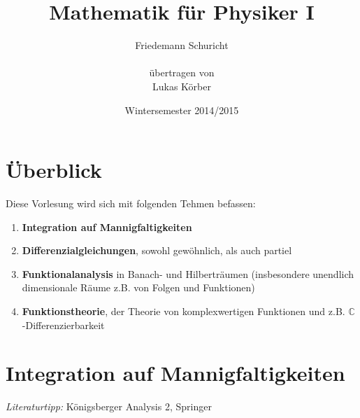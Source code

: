 \documentclass[a4paper,12pt,portrait]{book}
\title{Mathematik f\"ur Physiker I}
\author{Friedemann Schuricht\\ \\ \"ubertragen von\\Lukas K\"orber}
\date{Wintersemester 2014/2015}
\theoremstyle{theoremstyle}
\begin{document}
	\maketitle
\tableofcontents
\pagestyle{fancy}
\renewcommand{\thechapter}{\Roman{chapter}} 
\renewcommand*\thesection{\arabic{section}}
\renewcommand\theequation{\maybe{\arabic{chapter}}\arabic{section}.\arabic{equation}}
\DeclareRobustCommand\maybe[1]{\ifnum#1=\value{chapter}\relax\else\uppercase\expandafter{\romannumeral#1}.\fi}
\setcounter{chapter}{7}

\chapter*{Überblick}
Diese Vorlesung wird sich mit folgenden Tehmen befassen:
\begin{enumerate}
\item \textbf{Integration auf Mannigfaltigkeiten}
\item \textbf{Differenzialgleichungen}, sowohl gewöhnlich, als auch partiel
\item \textbf{Funktionalanalysis} in Banach- und Hilberträumen (insbesondere
unendlich dimensionale Räume z.B. von Folgen und Funktionen)
\item \textbf{Funktionstheorie}, der Theorie von komplexwertigen Funktionen
und z.B. $\mathbb{C}$-Differenzierbarkeit
\end{enumerate}

\chapter{Integration auf Mannigfaltigkeiten}
\emph{Literaturtipp:} Königsberger Analysis 2, Springer
\setcounter{section}{28}
\end{document}
